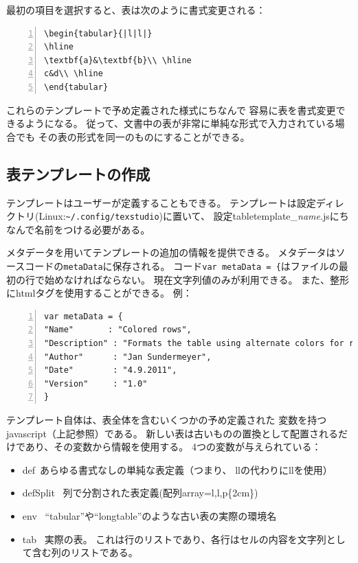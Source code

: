 最初の項目を選択すると、表は次のように書式変更される：

\begin{lstlisting}[frame=single,numbers=left]
\begin{tabular}{|l|l|}
\hline
\textbf{a}&\textbf{b}\\ \hline
c&d\\ \hline
\end{tabular}
\end{lstlisting}

これらのテンプレートで予め定義された様式にちなんで
容易に表を書式変更できるようになる。
従って、文書中の表が非常に単純な形式で入力されている場合でも
その表の形式を同一のものにすることができる。

\subsection{表テンプレートの作成}

テンプレートはユーザーが定義することもできる。
テンプレートは設定ディレクトリ(Linux:\verb+~/.config/texstudio+)に置いて、
設定tabletemplate\_\emph{name}.jsにちなんで名前をつける必要がある。

メタデータを用いてテンプレートの追加の情報を提供できる。
メタデータはソースコードの\verb+metaData+に保存される。
コード\verb+var metaData = {+はファイルの最初の行で始めなければならない。
現在文字列値のみが利用できる。
また、整形にhtmlタグを使用することができる。 例：

\begin{lstlisting}[frame=single,breaklines=true,numbers=left]
var metaData = {
"Name"       : "Colored rows",
"Description" : "Formats the table using alternate colors for rows. <br> <code>\usepackage[table]{xcolor}</code> is necessary.", 
"Author"      : "Jan Sundermeyer",
"Date"        : "4.9.2011",
"Version"     : "1.0"
}
\end{lstlisting}

テンプレート自体は、表全体を含むいくつかの予め定義された
変数を持つjavascript（上記参照）である。
新しい表は古いものの置換として配置されるだけであり、その変数から情報を使用する。
4つの変数が与えられている：

\begin{itemize}
\item
  def\ 
  あらゆる書式なしの単純な表定義（つまり、
  \textbar{}l\textbar{}l\textbar{}の代わりにllを使用）
\item
  defSplit \ 列で分割された表定義(配列array=l,l,p\{2cm\})
\item
  env \ ``tabular''や``longtable''のような古い表の実際の環境名
\item
  tab \ 実際の表。
  これは行のリストであり、各行はセルの内容を文字列として含む列のリストである。
\end{itemize}

